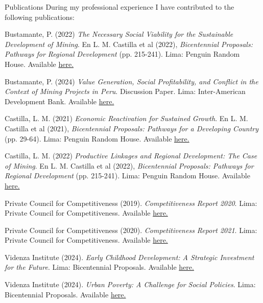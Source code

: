 \documentclass{resume} %
\begin{document}
\begin{rSection}{Publications}
During my professional experience I have contributed to the following publications:
\item Bustamante, P. (2022) \emph{The Necessary Social Viability for the Sustainable Development of Mining}. En L. M. Castilla et al (2022), \textit{Bicentennial Proposals: Pathways for Regional Development} (pp. 215-241). Lima: Penguin Random House. Available \href{https://www.casadellibro.com/ebook-propuestas-del-bicentenario-ebook/9786125068026/13125397}{here.}
\item Bustamante, P. (2024) \emph{Value Generation, Social Profitability, and Conflict in the Context of Mining Projects in Peru}. Discussion Paper. Lima: Inter-American Development Bank. Available \href{https://publications.iadb.org/es/generacion-de-valor-rentabilidad-social-y-conflictividad-en-el-entorno-de-proyectos-mineros-en-peru}{here.}
\item Castilla, L. M. (2021) \emph{Economic Reactivation for Sustained Growth}. En L. M. Castilla et al (2021), \textit{Bicentennial Proposals: Pathways for a Developing Country} (pp. 29-64). Lima: Penguin Random House. Available \href{https://www.casadellibro.com/ebook-propuestas-del-bicentenario-ebook/9786124272813/12336851}{here.}
\item Castilla, L. M. (2022) \emph{Productive Linkages and Regional Development: The Case of Mining}.  En L. M. Castilla et al (2022), \textit{Bicentennial Proposals: Pathways for Regional Development} (pp. 215-241). Lima: Penguin Random House. Available \href{https://www.casadellibro.com/ebook-propuestas-del-bicentenario-ebook/9786125068026/13125397}{here.}
\item Private Council for Competitiveness (2019). \emph{Competitiveness Report 2020}. Lima: Private Council for Competitiveness. Available \href{https://www.compite.pe/wp-content/uploads/2019/11/CPC_Peru_INC-2020_Libro-Web-Paginas.pdf}{here.}
\item Private Council for Competitiveness (2020). \emph{Competitiveness Report 2021}. Lima: Private Council for Competitiveness. Available \href{https://www.compite.pe/wp-content/uploads/2021/01/Informe-de-Competitividad-2021-CPC.pdf}{here.}
\item Videnza Institute (2024). \emph{Early Childhood Development: A Strategic Investment for the Future}. Lima: Bicentennial Proposals. Available \href{https://propuestasdelbicentenario.pe/wp-content/uploads/2024/08/Informe-de-desarrollo-infantil-temprano.pdf}{here.}
\item Videnza Institute (2024). \emph{Urban Poverty: A Challenge for Social Policies}. Lima: Bicentennial Proposals. Available \href{https://propuestasdelbicentenario.pe/wp-content/uploads/2024/08/Pobreza-urbana_un-desafio-para-las-politicas-sociales.pdf}{here.}
\end{rSection}
\end{document}
